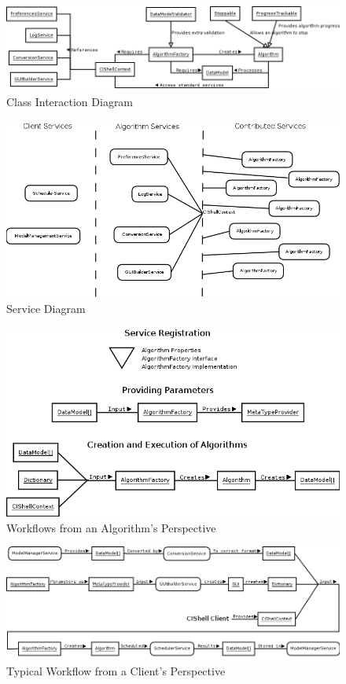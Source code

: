 \documentclass[a4]{article}
\begin{document}
\begin{figure}
\centering
\includegraphics[width=120mm]{graphics/classDiagram.png}
\caption{Class Interaction Diagram}
\label{ClassInteractionDiagram}
\end{figure}

\begin{figure}
\centering
\includegraphics[width=120mm]{graphics/serviceDiagram.png}
\caption{Service Diagram}
\label{serviceDiagram} 
\end{figure}

\begin{figure}
\centering
\includegraphics[width=120mm]{graphics/algorithmViewWorkflow.png}
\caption{Workflows from an Algorithm's Perspective}
\label{algorithmViewWorkflow} 
\end{figure}

\begin{figure}
\centering
\includegraphics[width=120mm]{graphics/clientViewWorkflow.png}
\caption{Typical Workflow from a Client's Perspective}
\label{clientViewWorkflow} 
\end{figure}
\end{document}
